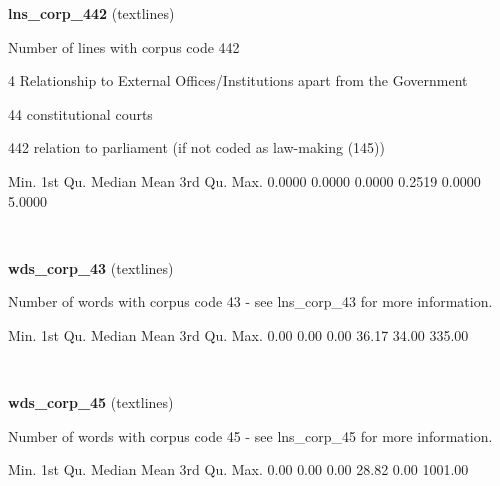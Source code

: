 \documentclass[]{article}
\newenvironment{Shaded}{\begin{snugshade}}{\end{snugshade}}
\newcommand{\FloatTok}[1]{\textcolor[rgb]{0.00,0.00,0.81}{{#1}}}
\newcommand{\NormalTok}[1]{{#1}}
\begin{document}
\vspace{1em}

\textbf{lns\_corp\_442} (textlines)

Number of lines with corpus code 442

4 Relationship to External Offices/Institutions apart from the
Government

44 constitutional courts

442 relation to parliament (if not coded as law-making (145))

\begin{Shaded}
\begin{Highlighting}[]
   \NormalTok{Min. 1st Qu.  Median    Mean 3rd Qu.    Max. }
 \FloatTok{0.0000}  \FloatTok{0.0000}  \FloatTok{0.0000}  \FloatTok{0.2519}  \FloatTok{0.0000}  \FloatTok{5.0000} 
\end{Highlighting}
\end{Shaded}

~

\vspace{1em}

\textbf{wds\_corp\_43} (textlines)

Number of words with corpus code 43 - see lns\_corp\_43 for more
information.

\begin{Shaded}
\begin{Highlighting}[]
   \NormalTok{Min. 1st Qu.  Median    Mean 3rd Qu.    Max. }
   \FloatTok{0.00}    \FloatTok{0.00}    \FloatTok{0.00}   \FloatTok{36.17}   \FloatTok{34.00}  \FloatTok{335.00} 
\end{Highlighting}
\end{Shaded}

~

\vspace{1em}

\textbf{wds\_corp\_45} (textlines)

Number of words with corpus code 45 - see lns\_corp\_45 for more
information.

\begin{Shaded}
\begin{Highlighting}[]
   \NormalTok{Min. 1st Qu.  Median    Mean 3rd Qu.    Max. }
   \FloatTok{0.00}    \FloatTok{0.00}    \FloatTok{0.00}   \FloatTok{28.82}    \FloatTok{0.00} \FloatTok{1001.00} 
\end{Highlighting}
\end{Shaded}

~

\vspace{1em}
\end{document}
